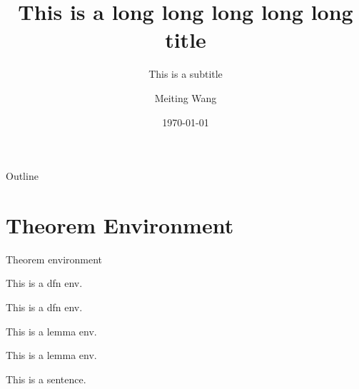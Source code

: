 \documentclass[compress,10pt,dvipsnames,notheorems]{beamer} %
\title[short title]{This is a long long long long long title}
\subtitle[short subtitle]{This is a subtitle}
\author[Meiting Wang]{Meiting Wang}
\institute[IESR-JNU]{
	\small Institute for Economic and Social Research \\ Jinan University
}
\date[2021/3/6]{\today}
\begin{document}
\begin{frame} %
	\titlepage
\end{frame}

{
\begin{frame}[noframenumbering]{Outline} %
	\tableofcontents[hideallsubsections]
\end{frame}
}


\section{Theorem Environment}%

\begin{frame}{Theorem environment}
	\begin{dfn}
		This is a dfn env.
	\end{dfn}\vspace{\baselineskip}

	\begin{dfn}\label{dfn:xxx}
		This is a dfn env.
	\end{dfn}\vspace{\baselineskip}

	\begin{lemma}
		This is a lemma env.
	\end{lemma}\vspace{\baselineskip}

	\begin{lemma}
		This is a lemma env.
	\end{lemma}\vspace{\baselineskip}

	\begin{thm}
		This is a sentence.
	\end{thm}
\end{frame}
\end{document}
